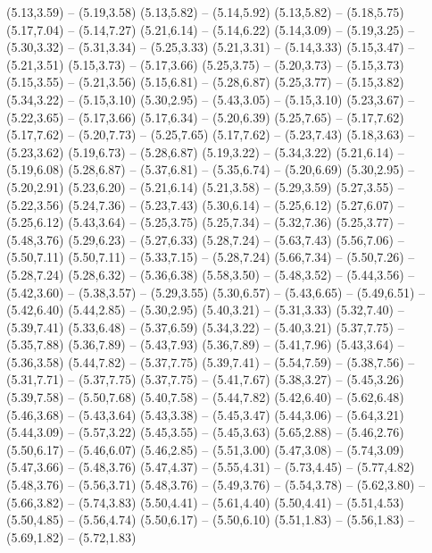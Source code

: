 {  (5.13,3.59) -- (5.19,3.58)
  (5.13,5.82) -- (5.14,5.92)
  (5.13,5.82) -- (5.18,5.75)
  (5.17,7.04) -- (5.14,7.27)
  (5.21,6.14) -- (5.14,6.22)
  (5.14,3.09) -- (5.19,3.25) -- (5.30,3.32) -- (5.31,3.34) -- (5.25,3.33)
  (5.21,3.31) -- (5.14,3.33)
  (5.15,3.47) -- (5.21,3.51)
  (5.15,3.73) -- (5.17,3.66)
  (5.25,3.75) -- (5.20,3.73) -- (5.15,3.73)
  (5.15,3.55) -- (5.21,3.56)
  (5.15,6.81) -- (5.28,6.87)
  (5.25,3.77) -- (5.15,3.82)
  (5.34,3.22) -- (5.15,3.10)
  (5.30,2.95) -- (5.43,3.05) -- (5.15,3.10)
  (5.23,3.67) -- (5.22,3.65) -- (5.17,3.66)
  (5.17,6.34) -- (5.20,6.39)
  (5.25,7.65) -- (5.17,7.62)
  (5.17,7.62) -- (5.20,7.73) -- (5.25,7.65)
  (5.17,7.62) -- (5.23,7.43)
  (5.18,3.63) -- (5.23,3.62)
  (5.19,6.73) -- (5.28,6.87)
  (5.19,3.22) -- (5.34,3.22)
  (5.21,6.14) -- (5.19,6.08)
  (5.28,6.87) -- (5.37,6.81) -- (5.35,6.74) -- (5.20,6.69)
  (5.30,2.95) -- (5.20,2.91)
  (5.23,6.20) -- (5.21,6.14)
  (5.21,3.58) -- (5.29,3.59)
  (5.27,3.55) -- (5.22,3.56)
  (5.24,7.36) -- (5.23,7.43)
  (5.30,6.14) -- (5.25,6.12)
  (5.27,6.07) -- (5.25,6.12)
  (5.43,3.64) -- (5.25,3.75)
  (5.25,7.34) -- (5.32,7.36)
  (5.25,3.77) -- (5.48,3.76)
  (5.29,6.23) -- (5.27,6.33)
  (5.28,7.24) -- (5.63,7.43)
  (5.56,7.06) -- (5.50,7.11)
  (5.50,7.11) -- (5.33,7.15) -- (5.28,7.24)
  (5.66,7.34) -- (5.50,7.26) -- (5.28,7.24)
  (5.28,6.32) -- (5.36,6.38)
  (5.58,3.50) -- (5.48,3.52) -- (5.44,3.56) -- (5.42,3.60) -- (5.38,3.57) -- (5.29,3.55)
  (5.30,6.57) -- (5.43,6.65) -- (5.49,6.51) -- (5.42,6.40)
  (5.44,2.85) -- (5.30,2.95)
  (5.40,3.21) -- (5.31,3.33)
  (5.32,7.40) -- (5.39,7.41)
  (5.33,6.48) -- (5.37,6.59)
  (5.34,3.22) -- (5.40,3.21)
  (5.37,7.75) -- (5.35,7.88)
  (5.36,7.89) -- (5.43,7.93)
  (5.36,7.89) -- (5.41,7.96)
  (5.43,3.64) -- (5.36,3.58)
  (5.44,7.82) -- (5.37,7.75)
  (5.39,7.41) -- (5.54,7.59) -- (5.38,7.56) -- (5.31,7.71) -- (5.37,7.75)
  (5.37,7.75) -- (5.41,7.67)
  (5.38,3.27) -- (5.45,3.26)
  (5.39,7.58) -- (5.50,7.68)
  (5.40,7.58) -- (5.44,7.82)
  (5.42,6.40) -- (5.62,6.48)
  (5.46,3.68) -- (5.43,3.64)
  (5.43,3.38) -- (5.45,3.47)
  (5.44,3.06) -- (5.64,3.21)
  (5.44,3.09) -- (5.57,3.22)
  (5.45,3.55) -- (5.45,3.63)
  (5.65,2.88) -- (5.46,2.76)
  (5.50,6.17) -- (5.46,6.07)
  (5.46,2.85) -- (5.51,3.00)
  (5.47,3.08) -- (5.74,3.09)
  (5.47,3.66) -- (5.48,3.76)
  (5.47,4.37) -- (5.55,4.31) -- (5.73,4.45) -- (5.77,4.82)
  (5.48,3.76) -- (5.56,3.71)
  (5.48,3.76) -- (5.49,3.76) -- (5.54,3.78) -- (5.62,3.80) -- (5.66,3.82) -- (5.74,3.83)
  (5.50,4.41) -- (5.61,4.40)
  (5.50,4.41) -- (5.51,4.53)
  (5.50,4.85) -- (5.56,4.74)
  (5.50,6.17) -- (5.50,6.10)
  (5.51,1.83) -- (5.56,1.83) -- (5.69,1.82) -- (5.72,1.83)
}

